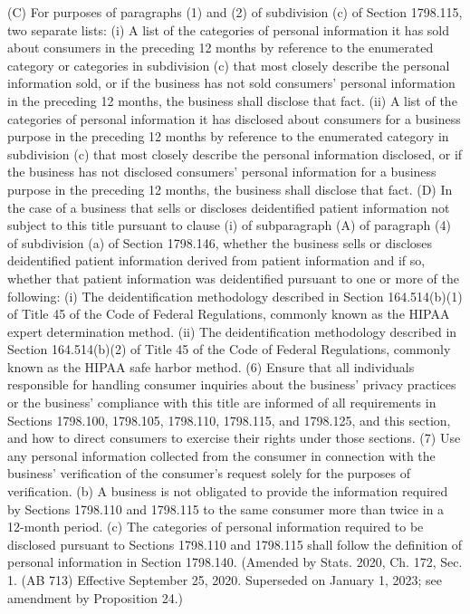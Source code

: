 (C) For purposes of paragraphs (1) and (2) of subdivision (c) of Section 1798.115, two separate lists:
(i) A list of the categories of personal information it has sold about consumers in the preceding 12 months by reference to the enumerated category or categories in subdivision (c) that most closely describe the personal information sold, or if the business has not sold consumers’ personal information in the preceding 12 months, the business shall disclose that fact.
(ii) A list of the categories of personal information it has disclosed about consumers for a business purpose in the preceding 12 months by reference to the enumerated category in subdivision (c) that most closely describe the personal information disclosed, or if the business has not disclosed consumers’ personal information for a business purpose in the preceding 12 months, the business shall disclose that fact.
(D) In the case of a business that sells or discloses deidentified patient information not subject to this title pursuant to clause (i) of subparagraph (A) of paragraph (4) of subdivision (a) of Section 1798.146, whether the business sells or discloses deidentified patient information derived from patient information and if so, whether that patient information was deidentified pursuant to one or more of the following:
(i) The deidentification methodology described in Section 164.514(b)(1) of Title 45 of the Code of Federal Regulations, commonly known as the HIPAA expert determination method.
(ii) The deidentification methodology described in Section 164.514(b)(2) of Title 45 of the Code of Federal Regulations, commonly known as the HIPAA safe harbor method.
(6) Ensure that all individuals responsible for handling consumer inquiries about the business’ privacy practices or the business’ compliance with this title are informed of all requirements in Sections 1798.100, 1798.105, 1798.110, 1798.115, and 1798.125, and this section, and how to direct consumers to exercise their rights under those sections.
(7) Use any personal information collected from the consumer in connection with the business’ verification of the consumer’s request solely for the purposes of verification.
(b) A business is not obligated to provide the information required by Sections 1798.110 and 1798.115 to the same consumer more than twice in a 12-month period.
(c) The categories of personal information required to be disclosed pursuant to Sections 1798.110 and 1798.115 shall follow the definition of personal information in Section 1798.140.
(Amended by Stats. 2020, Ch. 172, Sec. 1. (AB 713) Effective September 25, 2020. Superseded on January 1, 2023; see amendment by Proposition 24.)

